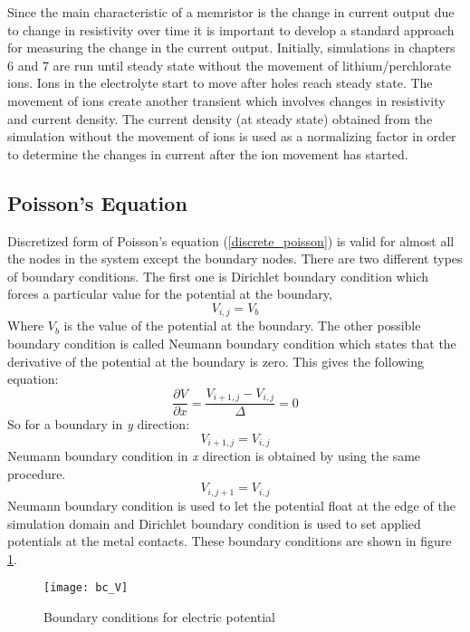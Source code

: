 \begin{doublespace}
Since the main characteristic of a memristor is the change in current output due to change in resistivity over time it is important to develop a standard approach for measuring the change in the current output. Initially, simulations in chapters 6 and 7 are run until steady state without the movement of lithium/perchlorate ions. Ions in the electrolyte start to move after holes reach steady state. The movement of ions create another transient which involves changes in resistivity and current density. The current density (at steady state) obtained from the simulation without the movement of ions is used as a normalizing factor in order to determine the changes in current after the ion movement has started.

\subsection{Poisson's Equation}
Discretized form of Poisson's equation (\ref{discrete_poisson}) is valid for almost all the nodes in the system except the boundary nodes. There are two different types of boundary conditions. The first one is  Dirichlet boundary condition which forces a particular value for the potential at the boundary\cite{ODEtxtbk},
\begin{equation}
V_{i,j}=V_{b}
\label{dirichlet}
\end{equation}
Where $V_{b}$ is the value of the potential at the boundary. The other possible boundary condition is called  Neumann boundary condition which states that the derivative of the potential at the boundary is zero\cite{ODEtxtbk}. This gives the following equation:
\begin{equation}
\frac{\partial V}{\partial x}=\frac{V_{i+1,j}-V_{i,j}}{\Delta}=0
\label{neumannx}
\end{equation}
So for a boundary in \textit{y} direction:
\begin{equation}
V_{i+1,j}=V_{i,j}
\label{neumanny}
\end{equation}
 Neumann boundary condition in \textit{x} direction is obtained by using the same procedure.
\begin{equation}
V_{i,j+1}=V_{i,j}
\end{equation}
Neumann boundary condition is used to let the potential float at the edge of the simulation domain and Dirichlet boundary condition is used to set applied potentials at the metal contacts. These boundary conditions are shown in figure \ref{bc_V}.

\begin{figure}[!htp]
\centering
\texttt{[image: bc\_V]}
\caption{Boundary conditions for electric potential } 
\label{bc_V}
\end{figure}



\end{doublespace}
